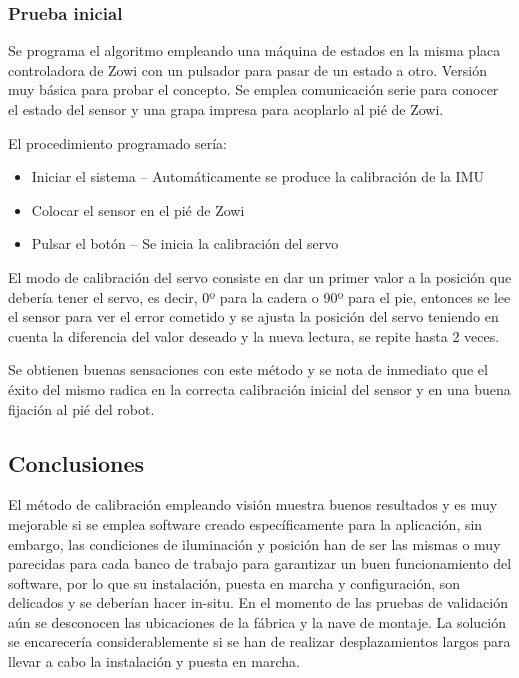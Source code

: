 \subsubsection{Prueba inicial}

Se programa el algoritmo empleando una máquina de estados en la misma placa controladora de Zowi con un pulsador para pasar de un estado a otro. Versión muy básica para probar el concepto. Se emplea comunicación serie para conocer el estado del sensor y una grapa impresa para acoplarlo al pié de Zowi.

El procedimiento programado sería:
\begin{itemize}
  \item Iniciar el sistema -- Automáticamente se produce la calibración de la IMU
  \item Colocar el sensor en el pié de Zowi
  \item Pulsar el botón -- Se inicia la calibración del servo
\end{itemize}

El modo de calibración del servo consiste en dar un primer valor a la posición que debería tener el servo, es decir, 0º para la cadera o 90º para el pie, entonces se lee el sensor para ver el error cometido y se ajusta la posición del servo teniendo en cuenta la diferencia del valor deseado y la nueva lectura, se repite hasta 2 veces.

Se obtienen buenas sensaciones con este método y se nota de inmediato que el éxito del mismo radica en la correcta calibración inicial del sensor y en una buena fijación al pié del robot. 


\subsection{Conclusiones}
El método de calibración empleando visión muestra buenos resultados y es muy mejorable si se emplea software creado específicamente para la aplicación, sin embargo, las condiciones de iluminación y posición han de ser las mismas o muy parecidas para cada banco de trabajo para garantizar un buen funcionamiento del software, por lo que su instalación, puesta en marcha y configuración, son delicados y se deberían hacer in-situ. En el momento de las pruebas de validación aún se desconocen las ubicaciones de la fábrica y la nave de montaje. La solución se encarecería considerablemente si se han de realizar desplazamientos largos para llevar a cabo la instalación y puesta en marcha.

